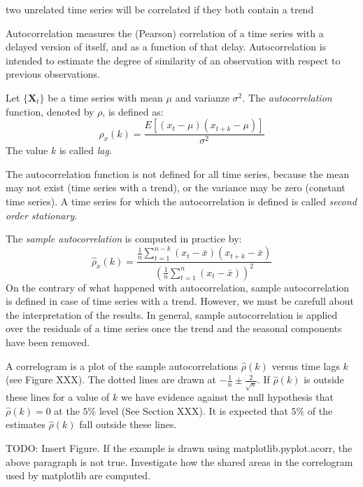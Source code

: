 {\color{red} two unrelated time series will be correlated if they both contain a trend}

Autocorrelation measures the (Pearson) correlation of a time series with a delayed version of itself, and as a function of that delay. Autocorrelation is intended to estimate the degree of similarity of an observation with respect to previous observations.

\begin{definition}
Let $\{\mathbf{X}_t\}$ be a time series with mean $\mu$ and varianze $\sigma^2$. The \emph{autocorrelation} function, denoted by $\rho$, is defined as:
\[
\rho_x(k) = \frac{E\left[\left(x_{t}-\mu\right)\left(x_{t+k}-\mu\right)\right]}{\sigma^{2}}
\]
The value $k$ is called \emph{lag}.
\end{definition}

The autocorrelation function is not defined for all time series, because the mean may not exist (time series with a trend), or the variance may be zero (constant time series). A time series for which the autocorrelation is defined is called \emph{second order stationary}.

The \emph{sample autocorrelation} is computed in practice by:
\[
\hat{\rho}_x(k) = \frac{ \frac{1}{n}\sum_{t=1}^{n-k}\left(x_{t}-\bar{x}\right)\left(x_{t+k}-\bar{x}\right) }{ \left( \frac{1}{n}\sum_{t=1}^{n}\left(x_{t}-\bar{x}\right) \right)^2 }
\]
On the contrary of what happened with autocorrelation, sample autocorrelation is defined in case of time series with a trend. However, we must be carefull about the interpretation of the results. In general, sample autocorrelation is applied over the residuals of a time series once the trend and the seasonal components have been removed.

A correlogram is a plot of the sample autocorrelations $\hat{\rho}(k)$ versus time lags $k$ (see Figure {\color{red} XXX}). The dotted lines are drawn at $-\frac{1}{n}\pm\frac{2}{\sqrt{n}}$. If $\hat{\rho}(k)$ is outside these lines for a value of $k$ we have evidence against the null hypothesis that $\hat{\rho}(k)=0$ at the $5\%$ level (See Section {\color{red} XXX}). It is expected that $5\%$ of the estimates $\hat{\rho}(k)$ fall outside these lines.

\begin{example}
{\color {red} TODO: Insert Figure. If the example is drawn using matplotlib.pyplot.acorr, the above paragraph is not true. Investigate how the shared areas in the correlogram used by matplotlib are computed.}
\end{example}

